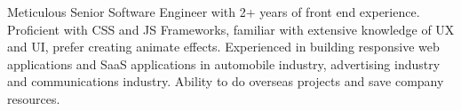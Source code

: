 

\begin{cvparagraph}


Meticulous Senior Software Engineer with 2+ years of front end experience. Proficient with CSS and JS Frameworks, familiar with extensive knowledge of UX and UI, prefer creating animate effects. Experienced in building responsive web applications and SaaS applications in automobile industry, advertising industry and communications industry. Ability to do overseas projects and save company resources.


\end{cvparagraph}
